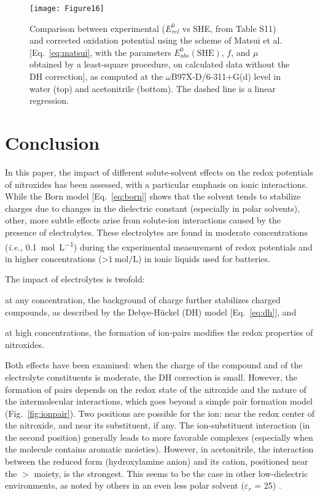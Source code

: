 \documentclass[review,preprint]{elsarticle}
\begin{document}
\begin{figure}[!h]
	\centering
	\texttt{[image: Figure16]}
	\caption{Comparison between experimental ($E^0_{rel} $ vs SHE, from Table S11) and corrected oxidation potential using the scheme of Matsui et al. \cite{matsuiDensityFunctionalTheory2013} [Eq.~\eqref{eq:matsui}, with the parameters $E_{abs}^0(\text{SHE})$, $f$, and $\mu$ obtained by a least-square procedure, on calculated data without the DH correction], as computed at the $\omega$B97X-D/6-311+G(d) level in water (top) and acetonitrile (bottom). The dashed line is a linear regression. }
	\label{fig:matsui}
\end{figure}

\clearpage
\section{Conclusion} \label{sec:conclusion}

In this paper, the impact of different solute-solvent effects on the redox potentials of nitroxides has been assessed, with a particular emphasis on ionic interactions. While the Born model [Eq.~\eqref{eq:born}] shows that the solvent tends to stabilize charges due to changes in the dielectric constant (especially in polar solvents), other, more subtle effects arise from solute-ion interactions caused by the presence of electrolytes. These electrolytes are found in moderate concentrations (\textit{i.e.,} \SI{0.1}{\mole\per\liter}) during the experimental measurement of redox potentials and in higher concentrations (>$\SI{1}{\mole\per\liter}$) in ionic liquids used for batteries.

The impact of electrolytes is twofold:
\begin{inparaenum}[(i)]
	\item at any concentration, the background of charge further stabilizes charged compounds, as described by the Debye-Hückel (DH) model [Eq.~\eqref{eq:dh}], and
	\item at high concentrations, the formation of ion-pairs modifies the redox properties of nitroxides.
\end{inparaenum}
Both effects have been examined: when the charge of the compound and of the electrolyte constituents is moderate, the DH correction is small. However, the formation of pairs depends on the redox state of the nitroxide and the nature of the intermolecular interactions, which goes beyond a simple pair formation model (Fig.~\ref{fig:ionpair}). Two positions are possible for the ion: near the redox center of the nitroxide, and near its substituent, if any. The ion-substituent interaction (in the second position) generally leads to more favorable complexes (especially when the molecule contains aromatic moieties). However, in acetonitrile, the interaction between the reduced form (hydroxylamine anion) and its cation, positioned near the $>$ moiety, is the strongest. This seems to be the case in other low-dielectric environments, as noted by others in an even less polar solvent ($\varepsilon_r$ = 25) \cite{wylieImprovedPerformanceAllOrganic2019a}.
\end{document}

